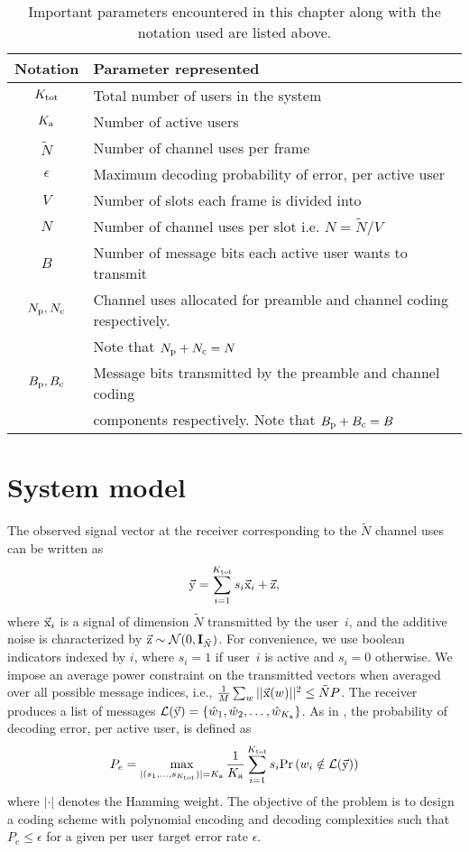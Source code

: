 \begin{table}[!ht]
\centering
\begin{tabular}{|c|l|}
\hline
Notation & Parameter represented\\
\hline
$K_{\text{tot}}$ & Total number of users in the system\\
$K_{\text{a}}$ & Number of active users\\
$\tilde{N}$ &  Number of channel uses per frame\\
$\epsilon$ & Maximum decoding probability of error, per active user\\
$V$ & Number of slots each frame is divided into\\
$N$ & Number of channel uses per slot i.e. $N=\tilde{N}/V$\\
$B$ & Number of message bits each active user wants to transmit\\
$N_{\mathrm{p}},N_{\mathrm{c}}$ & Channel uses allocated for preamble and channel coding respectively.\\
		& Note that  $N_{\mathrm{p}}+N_{\mathrm{c}}=N$ \\
$B_{\mathrm{p}},B_{\mathrm{c}}$ & Message bits transmitted by the preamble and channel coding \\
       & components respectively. Note that $B_{\mathrm{p}}+B_{\mathrm{c}}=B$\\
\hline
\end{tabular}
\caption{Important parameters encountered in this chapter along with the notation used are listed above.}
\label{table:notaiton}
\end{table}

\section{System model}
The observed signal vector at the receiver corresponding to the $\tilde{N}$ channel uses can be written as
\begin{equation}
\vec{\mathrm{y}} = \sum_{i=1}^{K_{\text{tot}}} s_i \vec{\mathrm{x}}_{i} + \vec{\mathrm{z}},
\end{equation}
where $\vec{\mathrm{x}}_i$ is a signal of dimension $\tilde{N}$ transmitted by the user~$i$, and the additive noise is characterized by $\vec{\mathrm{z}} \sim \mathcal{N}(0,\mathbf{I}_{\tilde{N}})$. For convenience, we use boolean indicators indexed by $i$, where $s_i =1$ if user~$i$ is active and $s_i = 0$ otherwise. We impose an average power constraint on the transmitted vectors when averaged over all possible message indices, i.e., $\frac{1}{M}\sum_{w} ||\vec{\mathrm{x}}(w)||^2\leq \tilde{N}P$.  The receiver produces a list of messages $\mathcal{L}(\vec{\mathrm{y}}) = \{\hat{w}_1,\hat{w}_2,\ldots,\hat{w}_{K_{\text{a}}} \}$. As in \cite{ordentlich2017low}, the probability of decoding error, per active user, is defined as
\begin{equation}\label{eqn:proboferrordefinition}
  P_e = \max_{|(s_1,\ldots,s_{K_{\text{tot}}})| = K_{\text{a}}} \frac{1}{K_{\text{a}}} \sum_{i=1}^{K_{\text{tot}}} s_i \mathrm{Pr}\left( w_i \notin \mathcal{L}(\vec{\mathrm{y}}) \right)
\end{equation}
where $|\cdot|$ denotes the Hamming weight. The objective of the problem is to design a coding scheme with polynomial encoding and decoding complexities such that $P_e \leq \epsilon$ for a given per user target error rate $\epsilon$.

